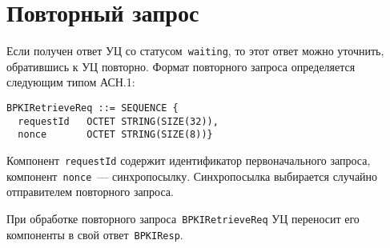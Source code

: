 \section{Повторный запрос}\label{FMT.BPKIRetrieveReq}

Если получен ответ УЦ со статусом~\texttt{waiting}, то этот ответ можно 
уточнить, обратившись к УЦ повторно. Формат повторного запроса 
определяется следующим типом АСН.1:
\begin{verbatim}
BPKIRetrieveReq ::= SEQUENCE { 
  requestId   OCTET STRING(SIZE(32)),
  nonce       OCTET STRING(SIZE(8))}
\end{verbatim}

Компонент~\texttt{requestId} содержит идентификатор первоначального 
запроса, компонент~\texttt{nonce}~--- синхропосылку. Синхропосылка 
выбирается случайно отправителем повторного запроса. 

При обработке повторного запроса~\texttt{BPKIRetrieveReq} УЦ
переносит его компоненты в свой ответ~\texttt{BPKIResp}.

